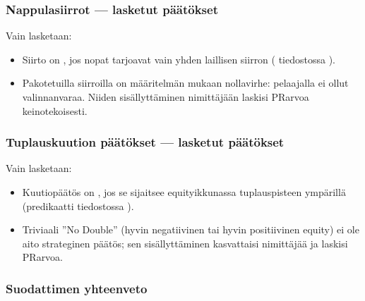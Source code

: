 \documentclass[letterpaper,10pt,finnish]{sphinxmanual}
\begin{document}
\subsubsection{Nappulasiirrot — lasketut päätökset}
\label{\detokenize{stats_parity:coups-de-pions-decisions-comptees}}
\sphinxAtStartPar
Vain  lasketaan:
\begin{itemize}
\item {} 
\sphinxAtStartPar
Siirto on , jos nopat tarjoavat vain yhden laillisen siirron ( tiedostossa ).

\item {} 
\sphinxAtStartPar
Pakotetuilla siirroilla on määritelmän mukaan nollavirhe: pelaajalla ei ollut valinnanvaraa. Niiden sisällyttäminen nimittäjään laskisi PR\sphinxhyphen{}arvoa keinotekoisesti.

\end{itemize}


\subsubsection{Tuplauskuution päätökset — lasketut päätökset}
\label{\detokenize{stats_parity:decisions-de-cube-decisions-comptees}}
\sphinxAtStartPar
Vain  lasketaan:
\begin{itemize}
\item {} 
\sphinxAtStartPar
Kuutiopäätös on , jos se sijaitsee equity\sphinxhyphen{}ikkunassa \sphinxcode{\sphinxupquote{{[}\sphinxhyphen{}0.16, +0.16{]}}} tuplauspisteen ympärillä (predikaatti  tiedostossa ).

\item {} 
\sphinxAtStartPar
Triviaali ”No Double” (hyvin negatiivinen tai hyvin positiivinen equity) ei ole aito strateginen päätös; sen sisällyttäminen kasvattaisi nimittäjää ja laskisi PR\sphinxhyphen{}arvoa.

\end{itemize}


\subsubsection{Suodattimen yhteenveto}
\label{\detokenize{stats_parity:resume-du-filtre}}
\end{document}
